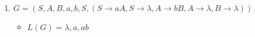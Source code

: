 \documentclass{article}
\date{}
\author{Robert Krency}
\title{Homework #1}
\begin{document}
\maketitle
\thispagestyle{fancy}

\begin{enumerate}

    \item $G = ({S, A, B}, {a,b}, S, (S \to aA, S \to \lambda, A \to bB, A \to \lambda, B \to \lambda))$
    \begin{itemize}
        \item $L(G) = {\lambda, a, ab}$
    \end{itemize}

\end{enumerate}
\end{document}
